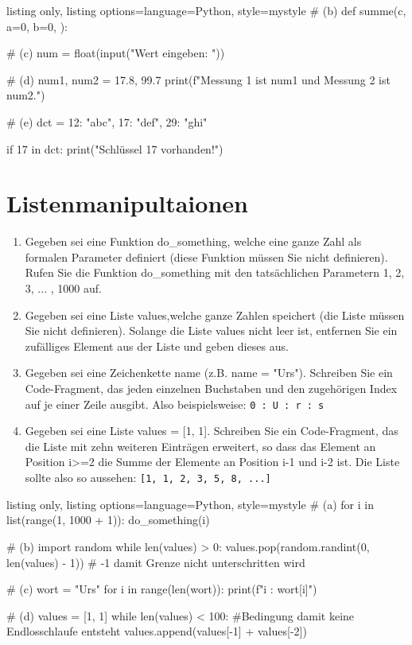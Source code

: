 \documentclass[11pt, oneside]{book}
\begin{document}
\begin{tcblisting}{listing only, listing options={language=Python, style=mystyle}}
# (b)
def summe(c, a=0, b=0, ):

# (c)
num = float(input("Wert eingeben: "))

# (d)
num1, num2 = 17.8, 99.7
print(f"Messung 1 ist {num1} und Messung 2 ist {num2}.")

# (e)
dct = {12: "abc", 17: "def", 29: "ghi"}

if 17 in dct:
    print("Schlüssel 17 vorhanden!")
\end{tcblisting}

\newpage
\section{Listenmanipultaionen}

\begin{enumerate}[label=(\alph*)]
    \item Gegeben sei eine Funktion do\_something, welche eine ganze Zahl als formalen Parameter definiert (diese Funktion m\"ussen Sie nicht definieren). Rufen Sie die Funktion do\_something mit den tatsächlichen Parametern 1, 2, 3, ... , 1000 auf.
    \item Gegeben sei eine Liste values,welche ganze Zahlen speichert (die Liste m\"ussen Sie nicht definieren). Solange die Liste values nicht leer ist, entfernen Sie ein zufälliges Element aus der Liste und geben dieses aus.
    \item Gegeben sei eine Zeichenkette name (z.B. name = "Urs"). Schreiben Sie ein Code-Fragment, das jeden einzelnen Buchstaben und den zugehörigen Index auf je einer Zeile ausgibt. Also beispielsweise: \newline
    \texttt{0 : U  : r  : s}
    \item Gegeben sei eine Liste values = [1, 1]. Schreiben Sie ein Code-Fragment, das die Liste mit zehn weiteren Einträgen erweitert, so dass das Element an Position i>=2 die Summe der Elemente an Position i-1 und i-2 ist. Die Liste sollte also so aussehen: \texttt{[1, 1, 2, 3, 5, 8, ...]}
\end{enumerate}


\begin{tcblisting}{listing only, listing options={language=Python, style=mystyle}}
# (a)
for i in list(range(1, 1000 + 1)):
    do_something(i)

# (b)
import random
while len(values) > 0:
    values.pop(random.randint(0, len(values) - 1)) # -1 damit Grenze nicht unterschritten wird

# (c)
wort = "Urs"
for i in range(len(wort)):
    print(f"{i} : {wort[i]}")

# (d)
values = [1, 1]
while len(values) < 100: #Bedingung damit keine Endlosschlaufe entsteht
    values.append(values[-1] + values[-2])
\end{tcblisting}
\end{document}
